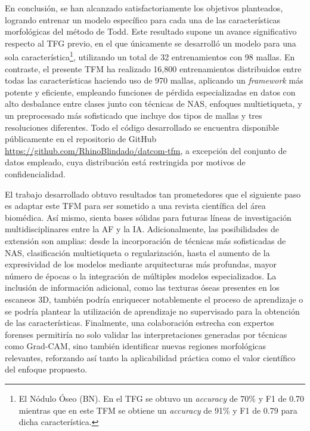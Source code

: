 En conclusión, se han alcanzado satisfactoriamente los objetivos planteados, logrando entrenar un modelo específico para cada una de las características morfológicas del método de Todd. Este resultado supone un avance significativo respecto al TFG previo, en el que únicamente se desarrolló un modelo para una sola característica\footnote{El Nódulo Óseo (BN). En el TFG se obtuvo un \textit{accuracy} de 70\% y F1 de 0.70 mientras que en este TFM se obtiene un \textit{accuracy} de 91\% y F1 de 0.79 para dicha característica.}, utilizando un total de 32 entrenamientos con 98 mallas. En contraste, el presente TFM ha realizado 16,800 entrenamientos distribuidos entre todas las características haciendo uso de 970 mallas, aplicando un \textit{framework} más potente y eficiente, empleando funciones de pérdida especializadas en datos con alto desbalance entre clases junto con técnicas de NAS, enfoques multietiqueta, y un preprocesado más sofisticado que incluye dos tipos de mallas y tres resoluciones diferentes. Todo el código desarrollado se encuentra disponible públicamente en el repositorio de GitHub \url{https://github.com/RhinoBlindado/datcom-tfm}, a excepción del conjunto de datos empleado, cuya distribución está restringida por motivos de confidencialidad.

El trabajo desarrollado obtuvo resultados tan prometedores que el siguiente paso es adaptar este TFM para ser sometido a una revista científica del área biomédica. Así mismo, sienta bases sólidas para futuras líneas de investigación multidisciplinares entre la AF y la IA. Adicionalmente, las posibilidades de extensión son amplias: desde la incorporación de técnicas más sofisticadas de NAS, clasificación multietiqueta o regularización, hasta el aumento de la expresividad de los modelos mediante arquitecturas más profundas, mayor número de épocas o la integración de múltiples modelos especializados. La inclusión de información adicional, como las texturas óseas presentes en los escaneos 3D, también podría enriquecer notablemente el proceso de aprendizaje o se podría plantear la utilización de aprendizaje no supervisado para la obtención de las características. Finalmente, una colaboración estrecha con expertos forenses permitiría no solo validar las interpretaciones generadas por técnicas como Grad-CAM, sino también identificar nuevas regiones morfológicas relevantes, reforzando así tanto la aplicabilidad práctica como el valor científico del enfoque propuesto.
